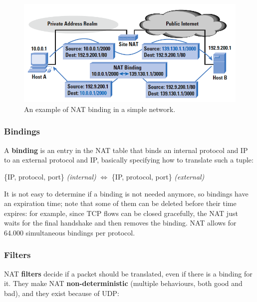 
\begin{figure}[h]
    \centering
    \includegraphics[scale=0.6]{img/nat_binding.png}
    \decoRule
    \caption{An example of NAT binding in a simple network.}
    \label{fig:nat_binding}
\end{figure}

\subsubsection{Bindings}
A \textbf{binding} is an entry in the NAT table that binds an internal protocol and IP to an external protocol and IP, basically specifying how to translate such a tuple:

\begin{center}
    \{IP, protocol, port\} \textit{(internal)} $\iff$ \{IP, protocol, port\} \textit{(external)}
\end{center}

It is not easy to determine if a binding is not needed anymore, so bindings have an expiration time; note that some of them can be deleted before their time expires: for example, since TCP flows can be closed gracefully, the NAT just waits for the final handshake and then removes the binding. NAT allows for 64.000 simultaneous bindings per protocol.


\subsubsection{Filters}
NAT \textbf{filters} decide if a packet should be translated, even if there is a binding for it. They make NAT \textbf{non-deterministic} (multiple behaviours, both good and bad), and they exist because of UDP:


